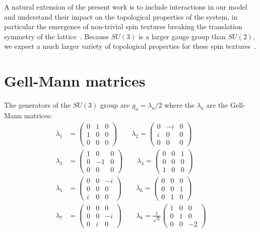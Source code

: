 \documentclass[aps,pra,showpacs,twocolumn,superscriptaddress]{revtex4-1}
\begin{document}
A natural extension of the present work is to include interactions in our model and understand their impact on the topological properties of the system, in particular the emergence of non-trivial spin textures
breaking the translation symmetry of the lattice~\cite{Cole_2012,Hofstetter12,Grass2014,Mandal2016}. Because $SU(3)$ is a larger gauge group than $SU(2)$, we expect a much larger variety of topological properties 
for these spin textures~\cite{Hueda12,Ezawa_book}.



\appendix
	
\section{Gell-Mann matrices}
\label{app:GMM}
The generators of the $SU(3)$ group are $g_a = \lambda_a/2$ where the $\lambda_a$ are the Gell-Mann matrices:
\begin{equation}
\begin{aligned}
\lambda_{1}&={\begin{pmatrix}0&1&0\\1&0&0\\0&0&0\end{pmatrix}} \qquad
\lambda_{2}={\begin{pmatrix}0&-i&0\\i&0&0\\0&0&0\end{pmatrix}} \\
\lambda_{3}&={\begin{pmatrix}1&0&0\\0&-1&0\\0&0&0\end{pmatrix}} \qquad
\lambda_{4}={\begin{pmatrix}0&0&1\\0&0&0\\1&0&0\end{pmatrix}}  \\
\lambda_{5}&={\begin{pmatrix}0&0&-i\\0&0&0\\i&0&0\end{pmatrix}} \qquad	
\lambda_{6}={\begin{pmatrix}0&0&0\\0&0&1\\0&1&0\end{pmatrix}} \\
\lambda_{7}&={\begin{pmatrix}0&0&0\\0&0&-i\\0&i&0\end{pmatrix}}  \qquad	
\lambda_{8}={\frac {1}{\sqrt {3}}}{\begin{pmatrix}1&0&0\\0&1&0\\0&0&-2\end{pmatrix}}
\end{aligned}
\end{equation}
\end{document}
